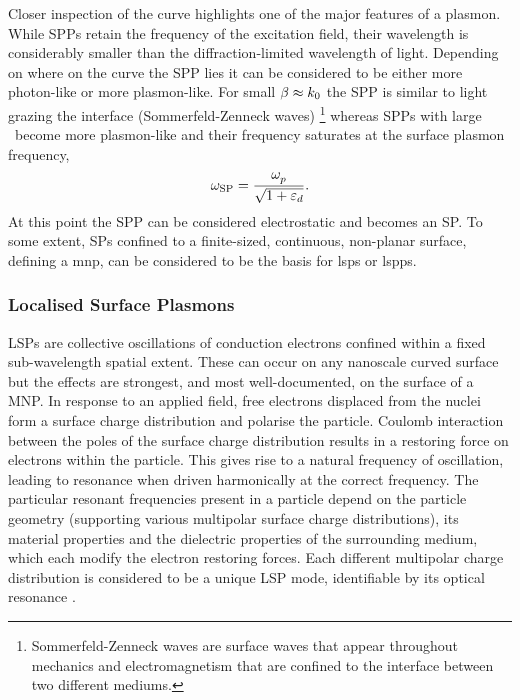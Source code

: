 \documentclass{article}
\begin{document}
Closer inspection of the curve highlights one of the major features of a plasmon. While SPPs retain the frequency of the excitation field, their wavelength is considerably smaller than the diffraction-limited wavelength of light.
Depending on where on the curve the SPP lies it can be considered to be either more photon-like or more plasmon-like. For small $\beta\approx k_0$ the SPP is similar to light grazing the interface (Sommerfeld-Zenneck waves)%
\footnote{Sommerfeld-Zenneck waves are surface waves that appear throughout mechanics and electromagnetism that are confined to the interface between two different mediums.}
whereas SPPs with large \wvm\ become more plasmon-like and their frequency saturates at the surface plasmon frequency,
\begin{equation}
	\omega_{\mathrm{SP}} = \frac{\omega_{p}^{}}{\sqrt{1+\varepsilon_d}}.
\end{equation}
At this point the SPP can be considered electrostatic and becomes an SP. To some extent, SPs confined to a finite-sized, continuous, non-planar surface, defining a \gls{mnp}, can be considered to be the basis for \glspl{lsp} or \glspl{lspp}.

\subsubsection{Localised Surface Plasmons}

LSPs are collective oscillations of conduction electrons confined within a fixed sub-wavelength spatial extent. These can occur on any nanoscale curved surface but the effects are strongest, and most well-documented, on the surface of a MNP. In response to an applied field, free electrons displaced from the nuclei form a surface charge distribution and polarise the particle. Coulomb interaction between the poles of the surface charge distribution results in a restoring force on electrons within the particle. This gives rise to a natural frequency of oscillation, leading to resonance when driven harmonically at the correct frequency. The particular resonant frequencies present in a particle depend on the particle geometry (supporting various multipolar surface charge distributions), its material properties and the dielectric properties of the surrounding medium, which each modify the electron restoring forces. Each different multipolar charge distribution is considered to be a unique LSP mode, identifiable by its optical resonance \cite{murray2007}.
\end{document}
